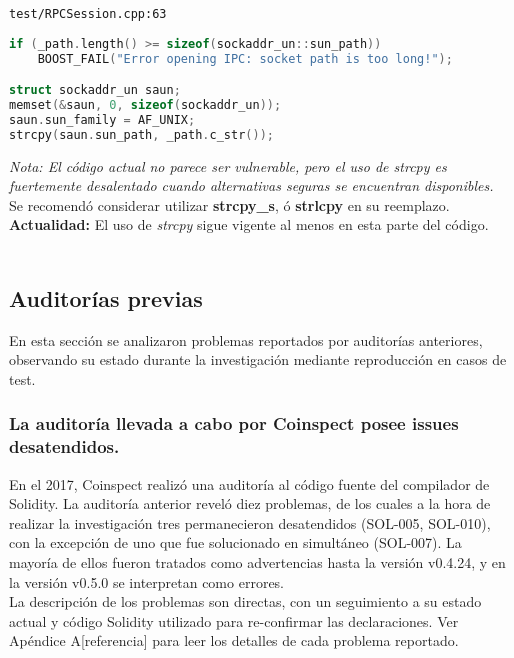 \verb|test/RPCSession.cpp:63|

\begin{lstlisting}[language=c++]
if (_path.length() >= sizeof(sockaddr_un::sun_path))
    BOOST_FAIL("Error opening IPC: socket path is too long!");

struct sockaddr_un saun;
memset(&saun, 0, sizeof(sockaddr_un));
saun.sun_family = AF_UNIX;
strcpy(saun.sun_path, _path.c_str());
\end{lstlisting}

\textit{Nota: El código actual no parece ser vulnerable, pero el uso de strcpy es fuertemente desalentado cuando alternativas seguras se encuentran disponibles.}\\

Se recomendó considerar utilizar \textbf{strcpy\_s}, ó \textbf{strlcpy} en su reemplazo.\\

\textbf{Actualidad:} El uso de \textit{strcpy} sigue vigente al menos en esta parte del código.\\\\

\subsection{Auditorías previas}
En esta sección se analizaron problemas reportados por auditorías anteriores, observando su estado durante la investigación mediante reproducción en casos de test.

\subsubsection{La auditoría llevada a cabo por Coinspect posee issues desatendidos.}

En el 2017, Coinspect realizó una auditoría\cite{SolidityCompilerAuditReport} al código fuente del compilador de Solidity. La auditoría anterior reveló diez problemas, de los cuales a la hora de realizar la investigación tres permanecieron desatendidos (SOL-005, SOL-010), con la excepción de uno que fue solucionado en simultáneo (SOL-007). La mayoría de ellos fueron tratados como advertencias hasta la versión v0.4.24, y en la versión v0.5.0 se interpretan como errores.\\

La descripción de los problemas son directas, con un seguimiento a su estado actual y código Solidity utilizado para re-confirmar las declaraciones. Ver Apéndice A[referencia] para leer los detalles de cada problema reportado.\\

